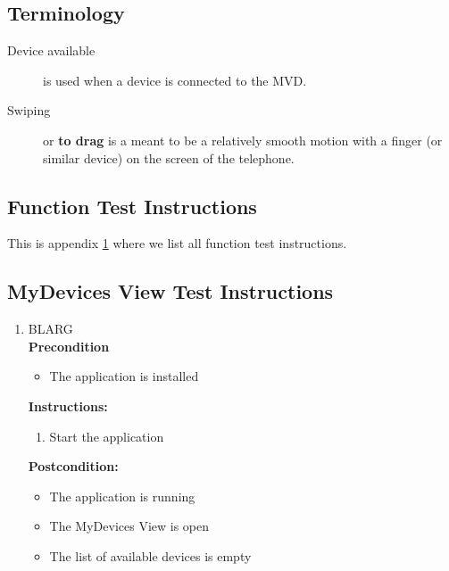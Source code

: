 \documentclass[a4paper]{article}
\newlength{\testlabellength}
\newenvironment{testlist}{\begin{enumerate}[label=\bfseries Instruction \thesubsection.\arabic* , labelindent=0pt, labelwidth=\testlabellength , leftmargin=2cm]}{\end{enumerate}}
\newenvironment{precondition}{
{\color{white}BLARG}\\ 
\textbf{Precondition}
\begin{itemize}[labelindent=0cm, labelwidth=2cm , leftmargin=1cm]
}
{\end{itemize}}
\newenvironment{instruction}{
\textbf{Instructions:}
\begin{enumerate}[label=\bfseries  \arabic*., labelindent=0cm, labelwidth=2cm , leftmargin=1cm]
}
{\end{enumerate}}
\newenvironment{postcondition}{
\textbf{Postcondition:}
\begin{itemize}[labelindent=0cm, labelwidth=2cm , leftmargin=1cm]
}
{\end{itemize}}
\begin{document}
\subsection{Terminology}
\begin{description}
\item[Device available] is used when a device is connected to the MVD.
\item[Swiping] or \textbf{to drag} is a meant to be a relatively smooth motion with a finger (or similar device) on the screen of the telephone.
\end{description}
\newpage
\begin{appendices}

\section{Function Test Instructions} \label{appendix:section:functiontest}
This is appendix \ref{appendix:section:functiontest} where we list all function test instructions.


\subsection{MyDevices View Test Instructions}
\begin{testlist}
    \item \label{MyDevicesTest1}
    	\begin{precondition}
    		\item The application is installed
    	\end{precondition}
    	\begin{instruction}
			\item Start the application
    	\end{instruction}
    	\begin{postcondition}
    		\item The application is running
    		\item The MyDevices View is open
    		\item The list of available devices is empty
    	\end{postcondition}
    

\end{testlist}
\end{appendices}
\end{document}
